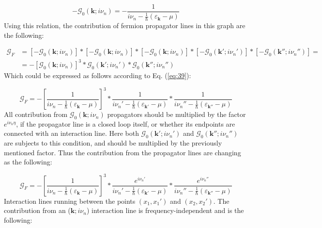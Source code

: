 \begin{equation} \label{eq:39}
- \mathcal{G}_{0} \left( \boldsymbol{k}; i \nu_{n} \right)
=
- \frac{1}{i \nu_{n} - \frac{1}{\hbar} \left( \varepsilon_{\boldsymbol{k}} - \mu \right)}
\end{equation}
Using this relation, the contribution of fermion propagator lines in this graph are the following:

\begin{align} \label{eq:40}
\mathcal{G}_{F}
&=
\left[ - \mathcal{G}_{0} \left( \boldsymbol{k}; i \nu_{n} \right) \right]
*
\left[ - \mathcal{G}_{0} \left( \boldsymbol{k}; i \nu_{n} \right) \right]
*
\left[ - \mathcal{G}_{0} \left( \boldsymbol{k}; i \nu_{n} \right) \right]
*
\left[ - \mathcal{G}_{0} \left( \boldsymbol{k}'; i \nu_{n}' \right) \right]
*
\left[ - \mathcal{G}_{0} \left( \boldsymbol{k}''; i \nu_{n}'' \right) \right]
= \nonumber \\
&=
- \left[ \mathcal{G}_{0} \left( \boldsymbol{k}; i \nu_{n} \right) \right]^{3}
*
\mathcal{G}_{0} \left( \boldsymbol{k}'; i \nu_{n}' \right)
*
\mathcal{G}_{0} \left( \boldsymbol{k}''; i \nu_{n}'' \right)
\end{align}
Which could be expressed as follows according to Eq. (\ref{eq:39}):

\begin{equation} \label{eq:41}
\mathcal{G}_{F}
=
- \left[ \frac{1}{i \nu_{n} - \frac{1}{\hbar} \left( \varepsilon_{\boldsymbol{k}} - \mu \right)} \right]^{3}
*
\frac{1}{i \nu_{n}' - \frac{1}{\hbar} \left( \varepsilon_{\boldsymbol{k}'} - \mu \right)}
*
\frac{1}{i \nu_{n}'' - \frac{1}{\hbar} \left( \varepsilon_{\boldsymbol{k}''} - \mu \right)}
\end{equation}
All contribution from $\mathcal{G}_{0} \left( \boldsymbol{k}; i \nu_{n} \right)$ propagators should be multiplied by the factor $e^{i \nu_{n} \eta}$, if the propagator line is a closed loop itself, or whether its endpoints are connected with an interaction line. Here both $\mathcal{G}_{0} \left( \boldsymbol{k}'; i \nu_{n}' \right)$ and $\mathcal{G}_{0} \left( \boldsymbol{k}''; i \nu_{n}'' \right)$ are subjects to this condition, and should be multiplied by the previously mentioned factor. Thus the contribution from the propagator lines are changing as the following:

\begin{equation} \label{eq:42}
\mathcal{G}_{F}
=
- \left[ \frac{1}{i \nu_{n} - \frac{1}{\hbar} \left( \varepsilon_{\boldsymbol{k}} - \mu \right)} \right]^{3}
*
\frac{e^{i \nu_{n}'}}{i \nu_{n}' - \frac{1}{\hbar} \left( \varepsilon_{\boldsymbol{k}'} - \mu \right)}
*
\frac{e^{i \nu_{n}''}}{i \nu_{n}'' - \frac{1}{\hbar} \left( \varepsilon_{\boldsymbol{k}''} - \mu \right)}
\end{equation}
Interaction lines running between the points $\left( x_{1}, x_{1}' \right)$ and $\left( x_{2}, x_{2}' \right)$. The contribution from an ($\boldsymbol{k}; i \nu_{n}$) interaction line is frequency-independent and is the following:


